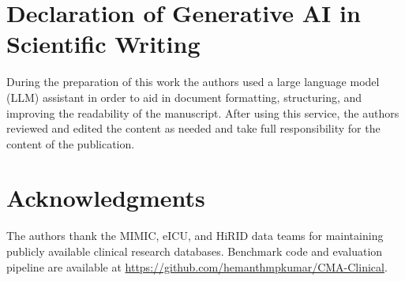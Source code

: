 \documentclass[review]{elsarticle}
\begin{document}
\section*{Declaration of Generative AI in Scientific Writing}
During the preparation of this work the authors used a large language model (LLM) assistant in order to aid in document formatting, structuring, and improving the readability of the manuscript. After using this service, the authors reviewed and edited the content as needed and take full responsibility for the content of the publication.

\section*{Acknowledgments}

The authors thank the MIMIC, eICU, and HiRID data teams for maintaining publicly
available clinical research databases. Benchmark code and evaluation pipeline are
available at \url{https://github.com/hemanthmpkumar/CMA-Clinical}.



\end{document}
